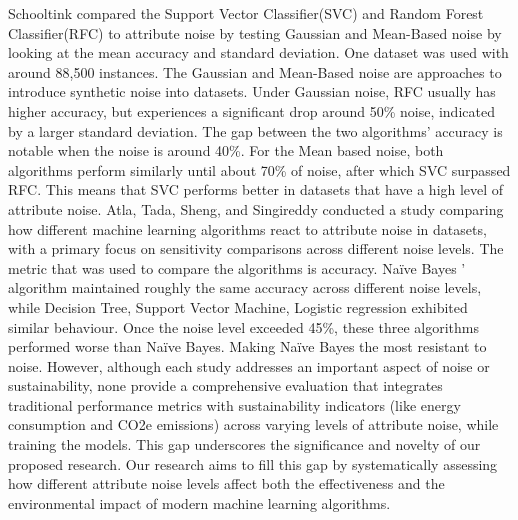 \documentclass[conference]{IEEEtran}
\begin{document}
\newline
\newline 
Schooltink \cite{schooltink} compared the Support Vector Classifier(SVC) and Random Forest Classifier(RFC) to attribute noise by testing Gaussian and Mean-Based noise by looking at the mean accuracy and standard deviation. One dataset was used with around 88,500 instances. The Gaussian and Mean-Based noise are approaches to introduce synthetic noise into datasets. Under Gaussian noise, RFC usually has higher accuracy, but experiences a significant drop around 50\% noise, indicated by a larger standard deviation. The gap between the two algorithms' accuracy is notable when the noise is around 40\%. For the Mean based noise, both algorithms perform similarly until about 70\% of noise, after which SVC surpassed RFC. This means that SVC performs better in datasets that have a high level of attribute noise. 
\newline
\newline
Atla, Tada, Sheng, and Singireddy \cite{atla2011} conducted a study comparing how different machine learning algorithms react to attribute noise in datasets, with a primary focus on sensitivity comparisons across different noise levels. The metric that was used to compare the algorithms is accuracy. Naïve Bayes ' algorithm maintained roughly the same accuracy across different noise levels, while Decision Tree, Support Vector Machine, Logistic regression exhibited similar behaviour. Once the noise level exceeded 45\%, these three algorithms performed worse than Naïve Bayes. Making Naïve Bayes the most resistant to noise.
\newline
\newline
However, although each study addresses an important aspect of noise or sustainability, none provide a comprehensive evaluation that integrates traditional performance metrics with sustainability indicators (like energy consumption and CO2e emissions) across varying levels of attribute noise, while training the models. This gap underscores the significance and novelty of our proposed research. Our research aims to fill this gap by systematically assessing how different attribute noise levels affect both the effectiveness and the environmental impact of modern machine learning algorithms.
\end{document}
